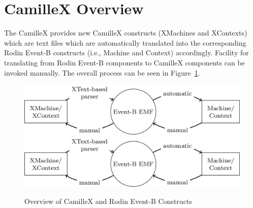 \section{CamilleX Overview}
\label{sec:overview}

The CamilleX provides new CamilleX constructs (XMachines and XContexts) which are text files which are automatically translated into the corresponding Rodin Event-B constructs (i.e., Machine and Context) accordingly.  Facility for translating from Rodin Event-B components to CamilleX components can be invoked manually. The overall process can be seen in Figure~\ref{fig:overview}.
\begin{figure}[!htbp]
  \centering
  \includegraphics{figures/tikz-overview.png}
  \endif
  \includegraphics{figures/tikz-overview.png}
  \endif
  
  \endif
  \caption{Overview of CamilleX and Rodin Event-B Constructs}
  \label{fig:overview}
\end{figure}


